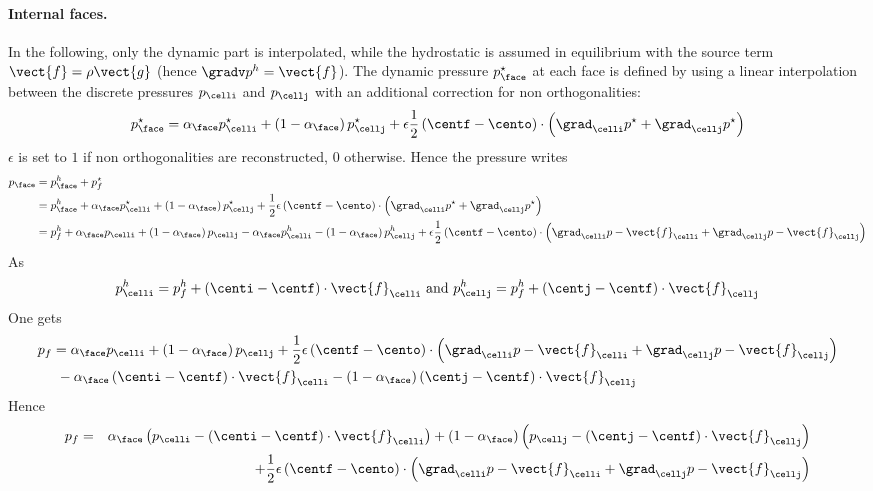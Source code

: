 \paragraph{Internal faces.} In the following, only the dynamic part is
interpolated, while the hydrostatic is assumed in equilibrium with the source
term $\vect{f}=\rho\vect{g}$ (hence $\gradv p^h=\vect{f}$). The dynamic pressure
$p_{\face}^\star$ at each face is defined by using a linear interpolation
between the discrete pressures $p_{\celli}$ and $p_{\cellj}$ with an additional
correction for non orthogonalities:
\begin{equation}
        p_{\face}^\star=\alpha_{\face}p_{\celli}^\star+\left(1-\alpha_{\face}\right)p_{\cellj}^\star+\epsilon\frac{1}{2}\left(\centf-\cento\right)\cdot\left(\grad_{\celli}{p}^\star+\grad_{\cellj}{p}^\star\right)
\end{equation}
$\epsilon$ is set to $1$ if non orthogonalities are reconstructed, $0$ otherwise.
Hence the pressure writes
\begin{align*}
        p_{\face}&=p_{\face}^{h}+p_{f}^\star \\
        &=p_{\face}^{h}+\alpha_{\face}p_{\celli}^\star+\left(1-\alpha_{\face}\right)p_{\cellj}^\star+\frac{1}{2}\epsilon\left(\centf-\cento\right)\cdot\left(\grad_{\celli}{p}^\star+\grad_{\cellj}{p}^\star\right) \\
        &=p_{f}^{h}+\alpha_{\face}p_{\celli}+\left(1-\alpha_{\face}\right)p_{\cellj}-\alpha_{\face}p_{\celli}^{h}-\left(1-\alpha_{\face}\right)p_{\cellj}^{h}+\epsilon\frac{1}{2}\left(\centf-\cento\right)\cdot\left(\grad_{\celli}{p}-\vect{f}_{\celli}+\grad_{\cellj}{p}-\vect{f}_{\cellj}\right)
\end{align*}
As
\begin{equation}
        p_{\celli}^{h}=p_{f}^{h}+\left(\centi-\centf\right)\cdot\vect{f}_{\celli} \text{ and }
        p_{\cellj}^{h}=p_{f}^{h}+\left(\centj-\centf\right)\cdot\vect{f}_{\cellj}
\end{equation}
One gets
\begin{align*}
  p_{f}&=\alpha_{\face}p_{\celli}+\left(1-\alpha_{\face}\right)p_{\cellj}+\frac{1}{2}\epsilon\left(\centf-\cento\right)\cdot\left(\grad_{\celli}{p}-\vect{f}_{\celli}+\grad_{\cellj}{p}-\vect{f}_{\cellj}\right) \\ & \ -\alpha_{\face}\left(\centi-\centf\right)\cdot\vect{f}_{\celli}-\left(1-\alpha_{\face}\right)\left(\centj-\centf\right)\cdot\vect{f}_{\cellj}
\end{align*}
Hence
\begin{align*}
  p_{f}&=&\alpha_{\face}\left(p_{\celli}-\left(\centi-\centf\right)\cdot\vect{f}_{\celli}\right)+\left(1-\alpha_{\face}\right)\left(p_{\cellj}-\left(\centj-\centf\right)\cdot\vect{f}_{\cellj}\right) \\ &&+\frac{1}{2}\epsilon\left(\centf-\cento\right)\cdot\left(\grad_{\celli}{p}-\vect{f}_{\celli}+\grad_{\cellj}{p}-\vect{f}_{\cellj}\right)
\end{align*}
